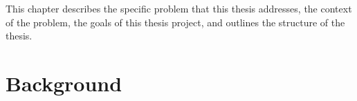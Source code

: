 \documentclass[english, biblatex, digitaloutput]{kththesis}
\begin{document}


This chapter describes the specific problem that this thesis addresses, the context of the problem, the
goals of this thesis project, and outlines the structure of the thesis.\\





\section{Background}
\label{sec:background}
\end{document}
